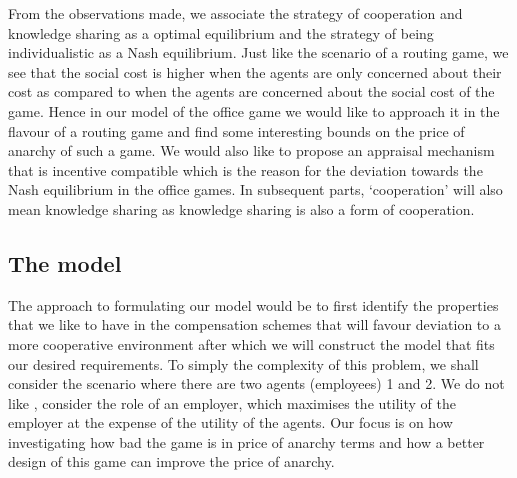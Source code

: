 \documentclass[10pt, a4paper]{article}
\begin{document}
	From the observations made, we associate the strategy of cooperation and knowledge sharing as a optimal equilibrium and the strategy of being individualistic as a Nash equilibrium. Just like the scenario of a routing game, we see that the social cost is higher when the agents are only concerned about their cost as compared to when the agents are concerned about the social cost of the game. Hence in our model of the office game we would like to approach it in the flavour of a routing game and find some interesting bounds on the price of anarchy of such a game. We would also like to propose an appraisal mechanism that is incentive compatible which is the reason for the deviation towards the Nash equilibrium in the office games. In subsequent parts, `cooperation' will also mean knowledge sharing as knowledge sharing is also a form of cooperation.
	
	 
	
	\subsection{The model}
	The approach to formulating our model would be to first identify the properties that we like to have in the compensation schemes that will favour deviation to a more cooperative environment after which we will construct the model that fits our desired requirements. To simply the complexity of this problem, we shall consider the scenario where there are two agents (employees) 1 and 2. We do not like \cite{Chakravarti2015}, consider the role of an employer, which maximises the utility of the employer at the expense of the utility of the agents. Our focus is on how investigating how bad the game is in price of anarchy terms and how a better design of this game can improve the price of anarchy.
	
\end{document}

